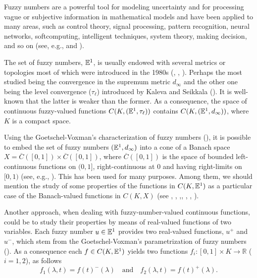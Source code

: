 \documentclass{amsart}
\newcommand{\R}{{\mathbb{R}}}
\newcommand{\fn}{\mathbb{E}\sp{1}}
\begin{document}
Fuzzy numbers are a powerful tool for modeling uncertainty and for processing vague or subjective information in mathematical models and have been
applied to many
areas, such as control theory, signal processing, pattern recognition, neural networks,
softcomputing, intelligent techniques, system theory, making decision, and so
on (see, e.g., \cite{LiYen} and \cite{Zimmermann}).

%
%
%



The set of fuzzy numbers, $\fn$, is usually endowed with several metrics or topologies most of which were introduced in the 1980s (\cite{PuriR:83}, \cite{PuriR:86}, \cite{kloeden:80}).  Perhaps the most studied being the convergence in the supremum metric $d_{\infty}$  and the other one being the level convergence ($\tau_{\ell}$) introduced by Kaleva and Seikkala (\cite{KalSeik:84}). It is well-known that the latter is weaker than the former.
As a consequence, the space of continuous fuzzy-valued functions $C(K,(\fn,\tau_{\ell}))$ contains $C(K,(\fn,d_{\infty}))$, where $K$ is a compact space.

Using  the Goetschel-Voxman's characterization of fuzzy numbers (\cite{GV}), it is possible to embed the set of fuzzy numbers $(\fn, d_{\infty})$ into a cone of a Banach space $X=\overline{C}([0,1])\times \overline{C}([0,1])$, where $\overline{C}([0,1])$ is the space of bounded left-continuous functions on $(0,1]$, right-continuous at $0$ and having right-limits on $[0,1)$ (see, e.g., \cite{WuMa:91}). This has been used for many purposes. Among them, we should mention the study of some properties of the functions in $C(K,\fn)$   as a particular case of the Banach-valued functions in $C(K,X)$ (see  \cite{WuMa:92-1}, \cite{WuMa:92}, \cite{chen},\cite{WuGong:00}, \cite{CHRL:16}, \cite{JardonSan:18}, \cite{FSS:2018}).

Another approach, when dealing with fuzzy-number-valued continuous functions, could be to study their properties by means of  real-valued functions of two variables. Each fuzzy number $u\in \fn$ provides two real-valued functions, $u^+$ and $u^-$, which stem from the Goetschel-Voxman's parametrization of fuzzy numbers (\cite{GV}).
As a consequence each
$f\in C(K,\fn)$ yields two functions
$f_i:[0,1]\times K\rightarrow \R$ ($i=1,2$), as follows
$$f_1(\lambda,t)=f(t)^-(\lambda) \quad\text{and}\quad f_2(\lambda,t)=f(t)^+(\lambda).$$
\end{document}
